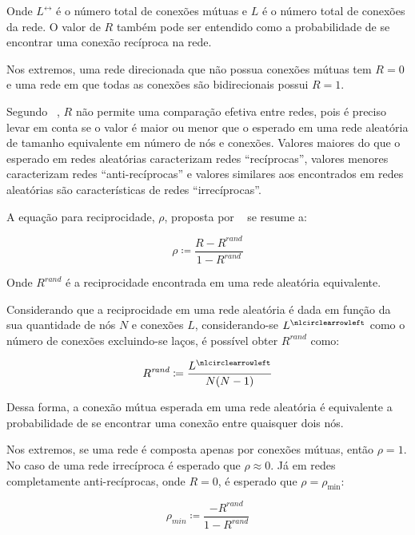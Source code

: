\documentclass[12pt,a4paper]{article}
\theoremstyle{hypo}
\newcommand{\defn}{\coloneqq} %
\newcommand{\noloop}[1]{#1^\nlcirclearrowleft} %
\newcommand{\linkboth}[1]{#1^\leftrightarrow} %
\begin{document}
Onde $\linkboth{L}$ é o número total de conexões mútuas e $L$ é o número total de conexões da rede. O valor de $R$ também pode ser entendido como a probabilidade de se encontrar uma conexão recíproca na rede.

Nos extremos, uma rede direcionada que não possua conexões mútuas tem $R = 0$ e uma rede em que todas as conexões são bidirecionais possui $R = 1$.

Segundo ~, $R$ não permite uma comparação efetiva entre redes, pois é preciso levar em conta se o valor é maior ou menor que o esperado em uma rede aleatória de tamanho equivalente em número de nós e conexões. Valores maiores do que o esperado em redes aleatórias caracterizam redes \enquote{recíprocas}, valores menores caracterizam redes \enquote{anti-recíprocas} e valores similares aos encontrados em redes aleatórias são características de redes \enquote{irrecíprocas}.

A equação para reciprocidade, $\rho$, proposta por ~ se resume a:

\begin{equation} \label{eq:reciprocidade-rand}
\rho \defn \frac{R - R^\textit{rand}}{1 - R^\textit{rand}}
\end{equation}

Onde $R^\textit{rand}$ é a reciprocidade encontrada em uma rede aleatória equivalente.

Considerando que a reciprocidade em uma rede aleatória é dada em função da sua quantidade de nós $N$ e conexões $L$, considerando-se $\noloop{L}$ como o número de conexões excluindo-se laços, é possível obter $R^\textit{rand}$ como:

\begin{equation}
R^\textit{rand} \defn \frac{\noloop{L}}{N(N - 1)}
\end{equation}

Dessa forma, a conexão mútua esperada em uma rede aleatória é equivalente a probabilidade de se encontrar uma conexão entre quaisquer dois nós. 

Nos extremos, se uma rede é composta apenas por conexões mútuas, então $\rho = 1$. No caso de uma rede irrecíproca é esperado que $\rho \approx 0$. Já em redes completamente anti-recíprocas, onde $R = 0$, é esperado que $\rho = \rho_\text{min}$:

\begin{equation}
\rho_\textit{min} \defn \frac{- R^\textit{rand}}{1 - R^\textit{rand}}
\end{equation}
\end{document}
